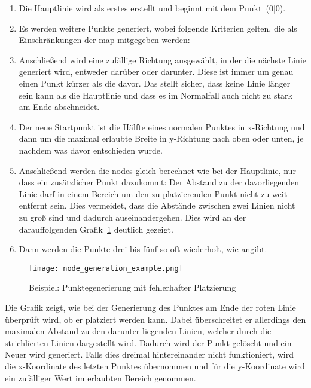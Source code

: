 \begin{enumerate}
    \item Die Hauptlinie wird als erstes erstellt und beginnt mit dem Punkt~(0|0).
    \item Es werden  weitere Punkte generiert, wobei folgende Kriterien gelten, die als Einschränkungen der map mitgegeben werden:
    \item Anschließend wird eine zufällige Richtung ausgewählt, in der die nächste Linie generiert wird, entweder darüber oder darunter.
    Diese ist immer um genau einen Punkt kürzer als die davor.
    Das stellt sicher, dass keine Linie länger sein kann als die Hauptlinie und dass es im Normalfall auch nicht zu stark am Ende abschneidet.
    \item Der neue Startpunkt ist die Hälfte eines normalen Punktes in x-Richtung und dann um die maximal erlaubte Breite in y-Richtung nach oben oder unten, je nachdem was davor entschieden wurde.
    \item Anschließend werden die nodes gleich berechnet wie bei der Hauptlinie, nur dass ein zusätzlicher Punkt dazukommt:
    Der Abstand zu der davorliegenden Linie darf in einem Bereich um den zu platzierenden Punkt nicht zu weit entfernt sein.
    Dies vermeidet, dass die Abstände zwischen zwei Linien nicht zu groß sind und dadurch auseinandergehen.
    Dies wird an der darauffolgenden Grafik~\ref{fig:point-generation} deutlich gezeigt.
    \item Dann werden die Punkte drei bis fünf so oft wiederholt, wie  angibt.
\end{enumerate}

\begin{figure}[H]
    \centering
    \texttt{[image: node\_generation\_example.png]}
    \caption{Beispiel: Punktegenerierung mit fehlerhafter Platzierung}\label{fig:point-generation}
\end{figure}
Die Grafik zeigt, wie bei der Generierung des Punktes am Ende der roten Linie überprüft wird, ob er platziert werden kann.
Dabei überschreitet er allerdings den maximalen Abstand zu den darunter liegenden Linien, welcher durch die strichlierten Linien dargestellt wird.
Dadurch wird der Punkt gelöscht und ein Neuer wird generiert.
Falls dies dreimal hintereinander nicht funktioniert, wird die x-Koordinate des letzten Punktes übernommen und für die y-Koordinate wird ein zufälliger Wert im erlaubten Bereich genommen.

